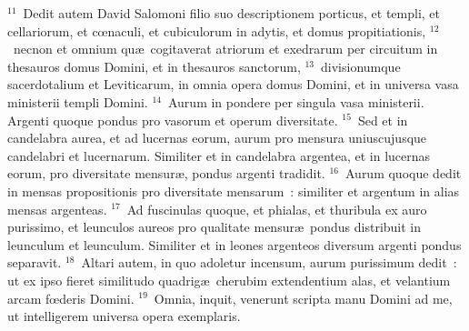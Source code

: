 ${}^{11}$~Dedit autem David Salomoni filio suo descriptionem porticus, et templi, et cellariorum, et cœnaculi, et cubiculorum in adytis, et domus propitiationis,
${}^{12}$~necnon et omnium qu\ae\ cogitaverat atriorum et exedrarum per circuitum in thesauros domus Domini, et in thesauros sanctorum,
${}^{13}$~divisionumque sacerdotalium et Leviticarum, in omnia opera domus Domini, et in universa vasa ministerii templi Domini.
${}^{14}$~Aurum in pondere per singula vasa ministerii. Argenti quoque pondus pro vasorum et operum diversitate.
${}^{15}$~Sed et in candelabra aurea, et ad lucernas eorum, aurum pro mensura uniuscujusque candelabri et lucernarum. Similiter et in candelabra argentea, et in lucernas eorum, pro diversitate mensur\ae , pondus argenti tradidit.
${}^{16}$~Aurum quoque dedit in mensas propositionis pro diversitate mensarum~: similiter et argentum in alias mensas argenteas.
${}^{17}$~Ad fuscinulas quoque, et phialas, et thuribula ex auro purissimo, et leunculos aureos pro qualitate mensur\ae\ pondus distribuit in leunculum et leunculum. Similiter et in leones argenteos diversum argenti pondus separavit.
${}^{18}$~Altari autem, in quo adoletur incensum, aurum purissimum dedit~: ut ex ipso fieret similitudo quadrig\ae\ cherubim extendentium alas, et velantium arcam fœderis Domini.
${}^{19}$~Omnia, inquit, venerunt scripta manu Domini ad me, ut intelligerem universa opera exemplaris.


